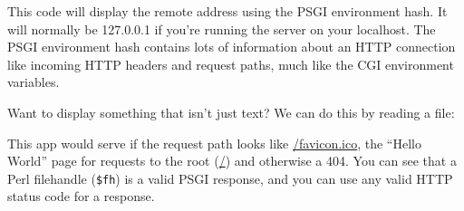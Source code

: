 
This code will display the remote address using the PSGI environment
hash. It will normally be 127.0.0.1 if you're running the server on your
localhost. The PSGI environment hash contains lots of information about
an HTTP connection like incoming HTTP headers and request paths, much
like the CGI environment variables.

Want to display something that isn't just text? We can do this by
reading a file:


This app would serve  if the request path looks like
\url{/favicon.ico}, the ``Hello World'' page for requests to the root (\url{/}) and
otherwise a 404. You can see that a Perl filehandle (\lstinline!$fh!) is
a valid PSGI response, and you can use any valid HTTP status code for a
response.


